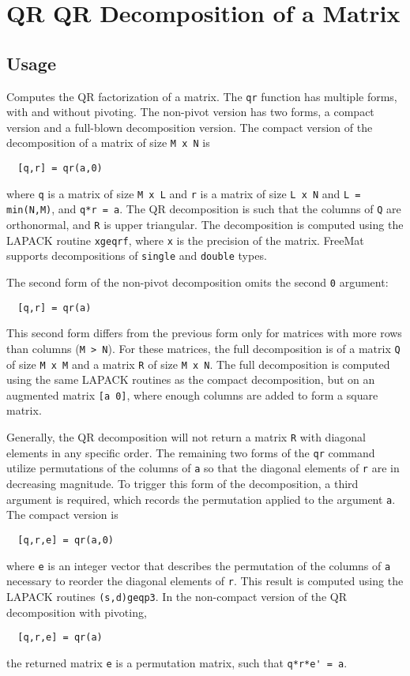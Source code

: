 \section{QR QR Decomposition of a Matrix}

\subsection{Usage}

Computes the QR factorization of a matrix.  The \verb|qr| function has
multiple forms, with and without pivoting.  The non-pivot version
has two forms, a compact version and a full-blown decomposition
version.  The compact version of the decomposition of a matrix 
of size \verb|M x N| is
\begin{verbatim}
  [q,r] = qr(a,0)
\end{verbatim}
where \verb|q| is a matrix of size \verb|M x L| and \verb|r| is a matrix of
size \verb|L x N| and \verb|L = min(N,M)|, and \verb|q*r = a|.  The QR decomposition is
such that the columns of \verb|Q| are orthonormal, and \verb|R| is upper
triangular.  The decomposition is computed using the LAPACK 
routine \verb|xgeqrf|, where \verb|x| is the precision of the matrix.  
FreeMat supports decompositions of \verb|single| and \verb|double| types.

The second form of the non-pivot decomposition omits the second \verb|0|
argument:
\begin{verbatim}
  [q,r] = qr(a)
\end{verbatim}
This second form differs from the previous form only for matrices
with more rows than columns (\verb|M > N|).  For these matrices, the
full decomposition is of a matrix \verb|Q| of size \verb|M x M| and 
a matrix \verb|R| of size \verb|M x N|.  The full decomposition is computed
using the same LAPACK routines as the compact decomposition, but
on an augmented matrix \verb|[a 0]|, where enough columns are added to
form a square matrix.

Generally, the QR decomposition will not return a matrix \verb|R| with
diagonal elements in any specific order.  The remaining two forms 
of the \verb|qr| command utilize permutations of the columns of \verb|a|
so that the diagonal elements of \verb|r| are in decreasing magnitude.
To trigger this form of the decomposition, a third argument is
required, which records the permutation applied to the argument \verb|a|.
The compact version is
\begin{verbatim}
  [q,r,e] = qr(a,0)
\end{verbatim}
where \verb|e| is an integer vector that describes the permutation of
the columns of \verb|a| necessary to reorder the diagonal elements of
\verb|r|.  This result is computed using the LAPACK routines \verb|(s,d)geqp3|.
In the non-compact version of the QR decomposition with pivoting,
\begin{verbatim}
  [q,r,e] = qr(a)
\end{verbatim}
the returned matrix \verb|e| is a permutation matrix, such that 
\verb|q*r*e' = a|.
